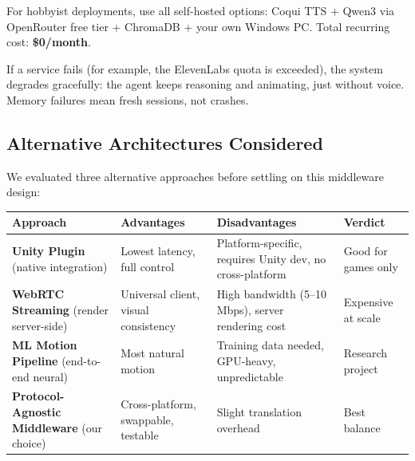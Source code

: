 \documentclass[11pt,letterpaper]{article}
\renewcommand{\arraystretch}{1.3}
\begin{document}
\begin{tipbox}
For hobbyist deployments, use all self-hosted options: Coqui TTS + Qwen3 via OpenRouter free tier + ChromaDB + your own Windows PC. Total recurring cost: \textbf{\$0/month}.
\end{tipbox}

\begin{tipbox}
If a service fails (for example, the ElevenLabs quota is exceeded), the system degrades gracefully: the agent keeps reasoning and animating, just without voice. Memory failures mean fresh sessions, not crashes.
\end{tipbox}

\subsection{Alternative Architectures Considered}

We evaluated three alternative approaches before settling on this middleware design:

\begin{center}
\renewcommand{\arraystretch}{1.3}
\begin{tabularx}{\textwidth}{@{}>{\raggedright\arraybackslash}p{3.2cm}YY>{\raggedright\arraybackslash}p{2.5cm}@{}}
\toprule
\textbf{Approach} & \textbf{Advantages} & \textbf{Disadvantages} & \textbf{Verdict} \\
\midrule
\textbf{Unity Plugin} (native integration) & Lowest latency, full control & Platform-specific, requires Unity dev, no cross-platform & Good for games only \\
\textbf{WebRTC Streaming} (render server-side) & Universal client, visual consistency & High bandwidth (5--10 Mbps), server rendering cost & Expensive at scale \\
\textbf{ML Motion Pipeline} (end-to-end neural) & Most natural motion & Training data needed, GPU-heavy, unpredictable & Research project \\
\textbf{Protocol-Agnostic Middleware} (our choice) & Cross-platform, swappable, testable & Slight translation overhead & \textcolor{successgreen}{Best balance} \\
\bottomrule
\end{tabularx}
\end{center}
\end{document}
